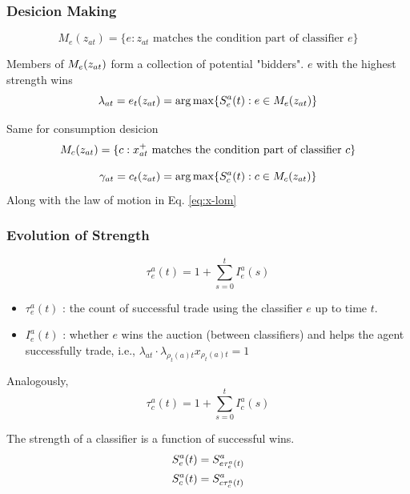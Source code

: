 \begin{frame}
    \frametitle{Desicion Making}
    
    \setcounter{equation}{4}
    \begin{equation}
        M_e(z_{at}) = \{e : z_{at} \text{ matches the condition part of classifier } e\}
    \end{equation}



    Members of $M_e(z_{at})$ form a collection of potential "bidders".
    $e$ with the highest strength wins
    \begin{equation}
        \lambda_{at} = e_t(z_{at}) = \arg\max\{S^a_e(t) : e \in M_e(z_{at})\}
    \end{equation}

    \pause

    Same for consumption desicion
    \begin{equation}
       M_c(z_{at}) = \{c : x_{at}^+ \text{ matches the condition part of classifier } c\}
    \end{equation}
    
    \begin{equation}
        \gamma_{at} = c_t(z_{at}) = \arg\max\{S^a_c(t) : c \in M_c(z_{at})\}
    \end{equation}
    Along with the law of motion in Eq. \ref{eq:x-lom}
\end{frame}


\begin{frame}
    \frametitle{Evolution of Strength}
    \begin{equation}
        \tau^a_e(t) = 1 + \sum_{s=0}^t I^a_e(s)
    \end{equation}
    
    \newcommand{\tea}{\tau^a_e(t)}

    \begin{itemize}
        \item    $\tea$ : the count of successful trade using the classifier $e$ 
        up to time $t$. 
        \item  $I^a_e(t)$ : whether $e$ wins the auction (between classifiers) 
        and helps the agent successfully trade, i.e., $\lambda_{at} \cdot \lambda_{\rho_t(a)t} x_{\rho_t(a)t}=1$
    \end{itemize}

    \pause

    Analogously, 
    \begin{equation}
        \tau^a_c(t) = 1 + \sum_{s=0}^t I^a_c(s)
    \end{equation}
 
    \vfill 
    The strength of a classifier is a function of successful wins.
    \begin{align*}
        S^a_e(t) &= S^a_{e \tau^a_e(t)} \\
        S^a_c(t) &= S^a_{c \tau^a_c(t)}
    \end{align*}
\end{frame}

